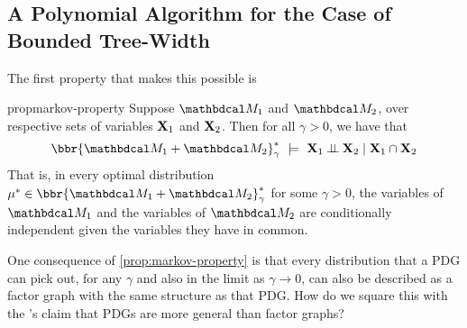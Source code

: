 \documentclass[twoside]{article}
\begin{document}
\subsection{A Polynomial Algorithm for the Case of Bounded Tree-Width}
The first property that makes this possible is 

\begin{linked}{prop}{markov-property}
	Suppose $\dg M_1$ and $\dg M_2$, over respective sets of variables $\mathbf{X}_1$ and $\mathbf{X}_2$.
	Then for all $\gamma > 0$, we have that
	\[
	 	\bbr{\dg M_1 \bundle \dg M_2}^*_\gamma
			~\models~
		\mat X_1 \mathbin{\bot\!\!\!\bot} \mat X_2 \mid \mat X_1 \cap \mat X_2
	\]
	That is, in every optimal distribution $\mu^* \in \bbr{\dg M_1 \bundle \dg M_2}^*_\gamma$ for some $\gamma>0$, the variables of $\dg M_1$ and the variables of $\dg M_2$ are conditionally independent given the variables they have in common.
\end{linked}

One consequence of \cref{prop:markov-property} is that every distribution that a PDG
can pick out, for any $\gamma$ and also in the limit as $\gamma \to 0$, can also be described as a factor graph with the same structure as that PDG.
How do we square this with the \citeauthor{pdg-aaai}'s claim that PDGs are more general than factor graphs?
\end{document}
